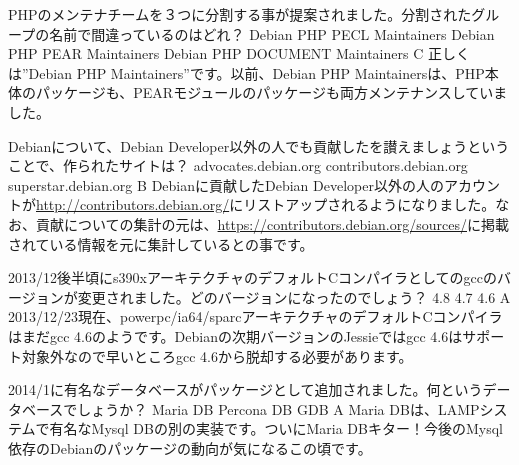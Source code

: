 %

\santaku
{PHPのメンテナチームを３つに分割する事が提案されました。分割されたグループの名前で間違っているのはどれ？}
{Debian PHP PECL Maintainers}
{Debian PHP PEAR Maintainers}
{Debian PHP DOCUMENT Maintainers}
{C}
{正しくは''Debian PHP Maintainers''です。以前、Debian PHP Maintainersは、PHP本体のパッケージも、PEARモジュールのパッケージも両方メンテナンスしていました。}

\santaku
{Debianについて、Debian Developer以外の人でも貢献したを讃えましょうということで、作られたサイトは？}
{advocates.debian.org}
{contributors.debian.org}
{superstar.debian.org}
{B}
{Debianに貢献したDebian Developer以外の人のアカウントが\url{http://contributors.debian.org/}にリストアップされるようになりました。なお、貢献についての集計の元は、\url{https://contributors.debian.org/sources/}に掲載されている情報を元に集計しているとの事です。}

\santaku
{2013/12後半頃にs390xアーキテクチャのデフォルトCコンパイラとしてのgccのバージョンが変更されました。どのバージョンになったのでしょう？}
{4.8}
{4.7}
{4.6}
{A}
{2013/12/23現在、powerpc/ia64/sparcアーキテクチャのデフォルトCコンパイラはまだgcc 4.6のようです。Debianの次期バージョンのJessieではgcc 4.6はサポート対象外なので早いところgcc 4.6から脱却する必要があります。}

\santaku
{2014/1に有名なデータベースがパッケージとして追加されました。何というデータベースでしょうか？}
{Maria DB}
{Percona DB}
{GDB}
{A}
{Maria DBは、LAMPシステムで有名なMysql DBの別の実装です。ついにMaria DBキター！今後のMysql依存のDebianのパッケージの動向が気になるこの頃です。}


